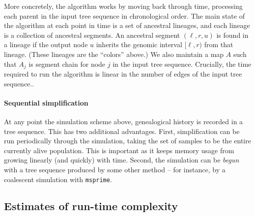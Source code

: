 \documentclass{article}
\newcommand{\msprime}{\texttt{msprime}}
\begin{document}
More concretely,
the algorithm works by moving back through time,
processing each parent in the input tree sequence in chronological order.
The main state of the algorithm at each point in time is a set of ancestral lineages,
and each lineage is a collection of ancestral segments.
An ancestral segment $(\ell, r, u)$ is found in a lineage
if the output node $u$ inherits the genomic interval $[\ell, r)$ from that lineage.
(These lineages are the ``colors'' above.)
We also maintain a map $A$ such that $A_j$ is segment chain for node $j$ in
the input tree sequence.
Crucially, the time required to run the algorithm is linear in the number of edges of the input tree sequence..

\paragraph{Sequential simplification}
At any point the simulation scheme above, genealogical history is recorded
in a tree sequence. This has two additional advantages. First, simplification
can be run periodically through the simulation, taking the set of samples to be
the entire currently alive population. This is important as it keeps memory
usage from growing linearly (and quickly) with time. Second, the simulation can
be \emph{begun} with a tree sequence produced by some other method -- for
instance, by a coalescent simulation with \msprime. 

\subsection*{Estimates of run-time complexity}
\end{document}
